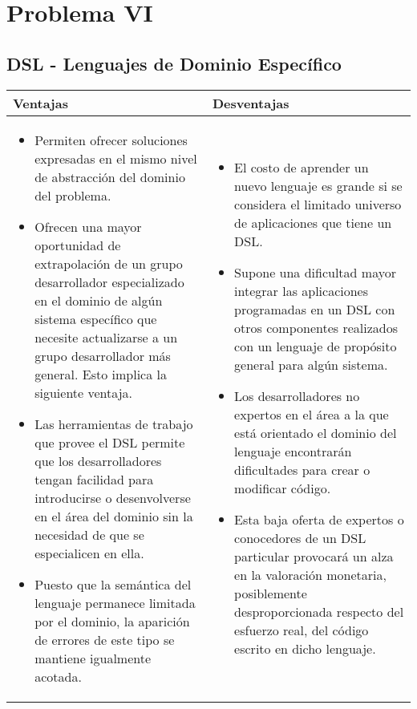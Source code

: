 \documentclass[12pt]{article}
\begin{document}
\section*{Problema VI}
\begin{center}
  \subsection*{DSL - Lenguajes de Dominio Específico}
  
\begin{tabularx}{\textwidth}{X|X}
	  \textbf{Ventajas} & \textbf{Desventajas} \\
	\hline
        \begin{itemize}
        \item Permiten ofrecer soluciones expresadas en el mismo nivel de abstracción del dominio del problema.
        \item Ofrecen una mayor oportunidad de extrapolación de un grupo desarrollador especializado en el dominio de algún sistema específico
          que necesite actualizarse a un grupo desarrollador más general. Esto implica la siguiente ventaja.
        \item Las herramientas de trabajo que provee el DSL permite que los desarrolladores tengan facilidad para introducirse o desenvolverse en el área del
          dominio sin la necesidad de que se especialicen en ella.
        \item Puesto que la semántica del lenguaje permanece limitada por el dominio, la aparición de errores de este tipo se mantiene
          igualmente acotada. \end{itemize} &
        \begin{itemize} \item El costo de aprender un nuevo lenguaje es grande si se considera el limitado universo de aplicaciones que tiene un DSL. 
        \item Supone una dificultad mayor integrar las aplicaciones programadas en un DSL con otros componentes realizados con un lenguaje de
          propósito general para algún sistema.
        \item Los desarrolladores no expertos en el área a la que está orientado el dominio del lenguaje encontrarán dificultades para crear o
          modificar código.
        \item Esta baja oferta de expertos o conocedores de un DSL particular provocará un alza en la valoración monetaria, posiblemente desproporcionada respecto del esfuerzo real, del código escrito en dicho lenguaje. 
        \end{itemize}  \\        
\end{tabularx}
\end{center}
\end{document}
